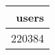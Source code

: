 \begin{table}[ht]
\centering
\begin{tabular}{r}
  \hline
users \\ 
  \hline
220384 \\ 
   \hline
\end{tabular}
\end{table}
